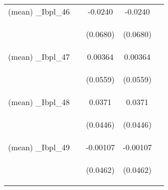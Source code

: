 \documentclass[]{article}
\begin{document}
\begin{center}
\begin{tabular}{lcccc}
(mean) \_Ibpl\_46 &  & -0.0240 & -0.0240 &  \\
\vspace{4pt} & \begin{footnotesize}\end{footnotesize} & \begin{footnotesize}(0.0680)\end{footnotesize} & \begin{footnotesize}(0.0680)\end{footnotesize} & \begin{footnotesize}\end{footnotesize} \\
(mean) \_Ibpl\_47 &  & 0.00364 & 0.00364 &  \\
\vspace{4pt} & \begin{footnotesize}\end{footnotesize} & \begin{footnotesize}(0.0559)\end{footnotesize} & \begin{footnotesize}(0.0559)\end{footnotesize} & \begin{footnotesize}\end{footnotesize} \\
(mean) \_Ibpl\_48 &  & 0.0371 & 0.0371 &  \\
\vspace{4pt} & \begin{footnotesize}\end{footnotesize} & \begin{footnotesize}(0.0446)\end{footnotesize} & \begin{footnotesize}(0.0446)\end{footnotesize} & \begin{footnotesize}\end{footnotesize} \\
(mean) \_Ibpl\_49 &  & -0.00107 & -0.00107 &  \\
\vspace{4pt} & \begin{footnotesize}\end{footnotesize} & \begin{footnotesize}(0.0462)\end{footnotesize} & \begin{footnotesize}(0.0462)\end{footnotesize} & \begin{footnotesize}\end{footnotesize} \\

\end{tabular}
\end{center}
\end{document}
